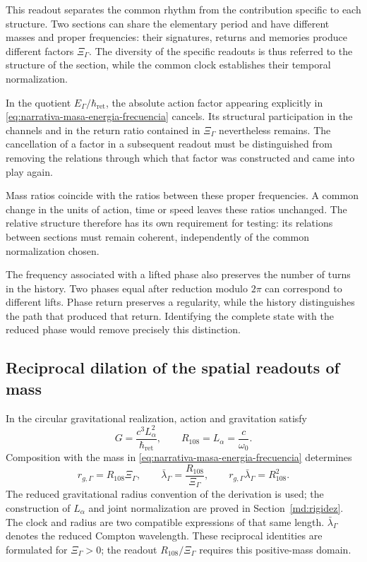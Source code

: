 This readout separates the common rhythm from the contribution specific to each
structure. Two sections can share the elementary period and have
different masses and proper frequencies: their signatures, returns and memories
produce different factors $\Xi_\Gamma$. The diversity of the
specific readouts is thus referred to the structure of the section, while the common
clock establishes their temporal normalization.

In the quotient $E_\Gamma/\hbar_{\mathrm{ret}}$, the absolute action
factor appearing explicitly in
\eqref{eq:narrativa-masa-energia-frecuencia} cancels. Its
structural participation in the channels and in the return ratio contained
in $\Xi_\Gamma$ nevertheless remains. The cancellation of a factor in a subsequent readout
must be distinguished from removing the relations through which
that factor was constructed and came into play again.

Mass ratios coincide with the ratios between these proper
frequencies. A common change in the units of action, time or speed
leaves these ratios unchanged. The relative structure therefore has
its own requirement for testing: its relations between sections must
remain coherent, independently of the common normalization chosen.

The frequency associated with a lifted phase also preserves the number of
turns in the history. Two phases equal after reduction modulo
$2\pi$ can correspond to different lifts. Phase return
preserves a regularity, while the history distinguishes the path that
produced that return. Identifying the complete state with the reduced
phase would remove precisely this distinction.

\subsection{Reciprocal dilation of the spatial readouts of mass}
\label{subsec:narrativa-reciprocidad-espacial}

In the circular gravitational realization, action and gravitation
satisfy
\begin{equation}
 G=\frac{c^3L_\alpha^2}{\hbar_{\mathrm{ret}}},
 \qquad R_{108}=L_\alpha=\frac{c}{\omega_0}.
 \label{eq:narrativa-gravedad-accion}
\end{equation}
Composition with the mass in
\eqref{eq:narrativa-masa-energia-frecuencia} determines
\begin{equation}
 \boxed{
 r_{g,\Gamma}=R_{108}\Xi_\Gamma,
 \qquad
 \bar\lambda_\Gamma=\frac{R_{108}}{\Xi_\Gamma},
 \qquad
 r_{g,\Gamma}\bar\lambda_\Gamma=R_{108}^{2}.}
 \label{eq:narrativa-longitudes-reciprocas}
\end{equation}
The reduced gravitational radius convention of the derivation is used;
the construction of $L_\alpha$ and joint normalization are proved
in Section~\ref{md:rigidez}. The clock and radius are two compatible
expressions of that same length.
$\bar\lambda_\Gamma$ denotes the reduced Compton wavelength. These
reciprocal identities are formulated for $\Xi_\Gamma>0$; the readout
$R_{108}/\Xi_\Gamma$ requires this positive-mass domain.

